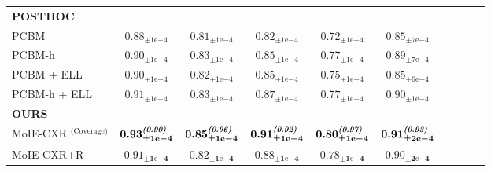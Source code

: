 \begin{table*}[h]
\begin{adjustbox}{max width=1\textwidth, center}
\begin{tabular}{lccccccccc}
\midrule
\scriptsize{\textbf{POSTHOC}} \\
\scriptsize{PCBM}~\cite{yuksekgonul2022post} & 
\scriptsize{$0.88_{\pm 1\mathrm{e}{-4}}$} & 
\scriptsize{$0.81_{\pm 1\mathrm{e}{-4}}$} & 
\scriptsize{$0.82_{\pm 1\mathrm{e}{-4}}$} &
\scriptsize{$0.72_{\pm 1\mathrm{e}{-4}}$} &
\scriptsize{$0.85_{\pm 7\mathrm{e}{-4}}$} &
 \\ 
\scriptsize{PCBM-h}~\cite{yuksekgonul2022post} &
\scriptsize{$0.90_{\pm 1\mathrm{e}{-4}}$} &
\scriptsize{$0.83_{\pm 1\mathrm{e}{-4}}$} & 
\scriptsize{$0.85_{\pm 1\mathrm{e}{-4}}$} &
\scriptsize{$0.77_{\pm 1\mathrm{e}{-4}}$} &
\scriptsize{$0.89_{\pm 7\mathrm{e}{-4}}$} &
\\ 
\scriptsize{PCBM + ELL}~\cite{yuksekgonul2022post, barbiero2022entropy} &
\scriptsize{$0.90_{\pm 1\mathrm{e}{-4}}$} &
\scriptsize{$0.82_{\pm 1\mathrm{e}{-4}}$} &
\scriptsize{$0.85_{\pm 1\mathrm{e}{-4}}$} &
\scriptsize{$0.75_{\pm 1\mathrm{e}{-4}}$} &
\scriptsize{$0.85_{\pm 6\mathrm{e}{-4}}$} &
\\
\scriptsize{PCBM-h + ELL}~\cite{yuksekgonul2022post, barbiero2022entropy} &
\scriptsize{$0.91_{\pm 1\mathrm{e}{-4}}$} &
\scriptsize{$0.83_{\pm 1\mathrm{e}{-4}}$} & 
\scriptsize{$0.87_{\pm 1\mathrm{e}{-4}}$} &
\scriptsize{$0.77_{\pm 1\mathrm{e}{-4}}$} &
\scriptsize{$0.90_{\pm 1\mathrm{e}{-4}}$} &
\\
 
\midrule
\scriptsize{\textbf{OURS}} \\
\scriptsize{MoIE-CXR $^{\text{(Coverage)}}$} & 
\scriptsize{$\boldsymbol{0.93^\textbf{\emph{(0.90)}}_{\pm 1\mathrm{e}{-4}}}$} &
\scriptsize{$\boldsymbol{0.85^\textbf{\emph{(0.96)}}_{\pm 1\mathrm{e}{-4}}}$} &
\scriptsize{$\boldsymbol{0.91^\textbf{\emph{(0.92)}}_{\pm 1\mathrm{e}{-4}}}$} &
\scriptsize{$\boldsymbol{0.80^\textbf{\emph{(0.97)}}_{\pm 1\mathrm{e}{-4}}}$} &
\scriptsize{$\boldsymbol{0.91^\textbf{\emph{(0.93)}}_{\pm 2\mathrm{e}{-4}}}$} &
\\ 

\scriptsize{MoIE-CXR+R} & 
\scriptsize{$\boldsymbol{0.91_{\pm 1\mathrm{e}{-4}}}$} &
\scriptsize{$\boldsymbol{0.82_{\pm 1\mathrm{e}{-4}}}$} &
\scriptsize{$\boldsymbol{0.88_{\pm 1\mathrm{e}{-4}}}$} &
\scriptsize{$\boldsymbol{0.78_{\pm 1\mathrm{e}{-4}}}$} &
\scriptsize{$\boldsymbol{0.90_{\pm 2\mathrm{e}{-4}}}$}
\\ 
\bottomrule
\end{tabular}
\end{adjustbox}
\label{tab:performance}
\end{table*}

